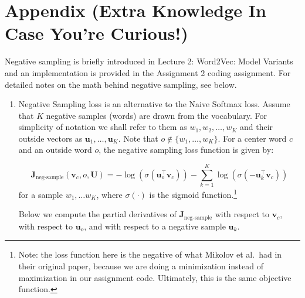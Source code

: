 \section{Appendix (Extra Knowledge In Case You're Curious!)}
Negative sampling is briefly introduced in Lecture 2: Word2Vec: Model Variants and an implementation is provided in the Assignment 2 coding assignment. For detailed notes on the math behind negative sampling, see below.
\begin{enumerate}
    \item Negative Sampling loss is an alternative to the Naive Softmax loss.  Assume that $K$ negative samples (words) are drawn from the vocabulary. For simplicity of notation we shall refer to them as $w_1, w_2, \dots, w_K$ and their outside vectors as $\bm u_1, \dots, \bm u_K$. 
        Note that $o\notin\{w_1, \dots, w_K\}$. 
        For a center word $c$ and an outside word $o$, the negative sampling loss function is given by:

        \begin{equation}
        \bm J_{\text{neg-sample}}(\bm v_c, o, \bm U) = -\log(\sigma(\bm u_o^\top \bm v_c)) - \sum_{k=1}^K \log(\sigma(-\bm u_k^\top \bm v_c))
        \end{equation}
        for a sample $w_1, \ldots w_K$, where $\sigma(\cdot)$ is the sigmoid function.\footnote{Note: the loss function here is the negative of what Mikolov et al.\ had in their original paper, because we are doing a minimization instead of maximization in our assignment code. Ultimately, this is the same objective function.}

        Below we compute the partial derivatives of $\bm J_{\text{neg-sample}}$ with respect to $\bm v_c$, with respect to $\bm u_o$, and with respect to a negative sample $\bm u_k$.


\end{enumerate}
